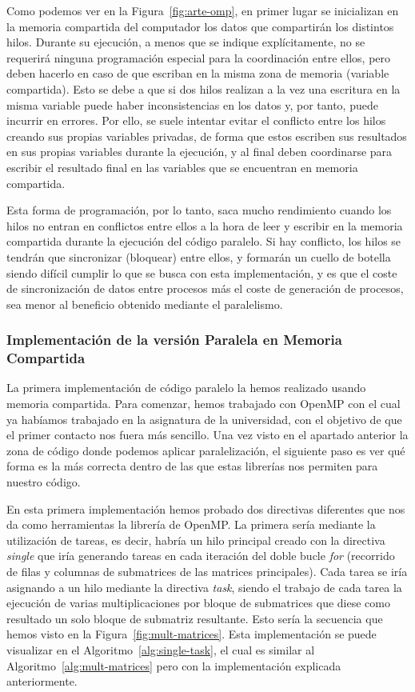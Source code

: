 \documentclass[a4paper,12pt]{article}
\begin{document}
Como podemos ver en la Figura~\ref{fig:arte-omp}, en primer lugar se inicializan en la memoria compartida del computador los datos que compartirán los distintos hilos. Durante su ejecución, a menos que se indique explícitamente, no se requerirá ninguna programación especial para la coordinación entre ellos, pero deben hacerlo en caso de que escriban en la misma zona  de memoria (variable compartida). Esto se debe a que si dos hilos realizan a la vez una escritura en la misma variable puede haber inconsistencias en los datos y, por tanto, puede incurrir en errores. Por ello, se suele intentar evitar el conflicto entre los hilos creando sus propias variables privadas, de forma que estos escriben sus resultados en sus propias variables durante la ejecución, y al final deben coordinarse para escribir el resultado final en las variables que se encuentran en memoria compartida.


Esta forma de programación, por lo tanto, saca mucho rendimiento cuando los hilos no entran en conflictos entre ellos a la hora de leer y escribir en la memoria compartida durante la ejecución del código paralelo. Si hay conflicto, los hilos se tendrán que sincronizar (bloquear) entre ellos, y formarán un cuello de botella siendo difícil cumplir lo que se busca con esta implementación, y es que el coste de sincronización de datos entre procesos más el coste de generación de procesos, sea menor al beneficio obtenido mediante el paralelismo.


\subsubsection{Implementación de la versión Paralela en Memoria Compartida} \label{section:imp-memCom}

La primera implementación de código paralelo la hemos realizado usando memoria compartida. Para comenzar, hemos trabajado con OpenMP con el cual ya habíamos trabajado en la asignatura de la universidad, con el objetivo de que el primer contacto nos fuera más sencillo. Una vez visto en el apartado anterior la zona de código donde podemos aplicar paralelización, el siguiente paso es ver qué forma es la más correcta dentro de las que estas librerías nos permiten para nuestro código.

En esta primera implementación hemos probado dos directivas diferentes que nos da como herramientas la librería de OpenMP. La primera sería mediante la utilización de tareas, es decir, habría un hilo principal creado con la directiva {\it single} que iría generando tareas en cada iteración del doble bucle {\it for} (recorrido de filas y columnas de submatrices de las matrices principales). Cada tarea se iría asignando a un hilo mediante la directiva {\it task}, siendo el trabajo de cada tarea la ejecución de varias multiplicaciones por bloque de submatrices que diese como resultado un solo bloque de submatriz resultante. Esto sería la secuencia que hemos visto en la Figura~\ref{fig:mult-matrices}. Esta implementación se puede visualizar en el Algoritmo~\ref{alg:single-task}, el cual es similar al Algoritmo~\ref{alg:mult-matrices} pero con la implementación explicada anteriormente.
\end{document}

